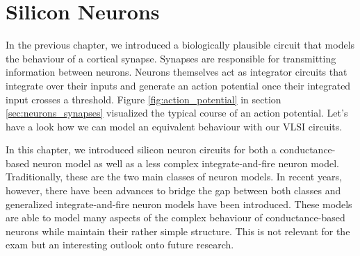 \newpage
\section{Silicon Neurons}

In the previous chapter, we introduced a biologically plausible circuit that models the behaviour of a cortical synapse. Synapses are responsible for transmitting information between neurons. Neurons themselves act as integrator circuits that integrate over their inputs and generate an action potential once their integrated input crosses a threshold. Figure \ref{fig:action_potential} in section \ref{sec:neurons_synapses} visualized the typical course of an action potential. Let's have a look how we can model an equivalent behaviour with our VLSI circuits.




In this chapter, we introduced silicon neuron circuits for both a conductance-based neuron model as well as a less complex integrate-and-fire neuron model. Traditionally, these are the two main classes of neuron models. In recent years, however, there have been advances to bridge the gap between both classes and generalized integrate-and-fire neuron models have been introduced. These models are able to model many aspects of the complex behaviour of conductance-based neurons while maintain their rather simple structure. This is not relevant for the exam but an interesting outlook onto future research.

